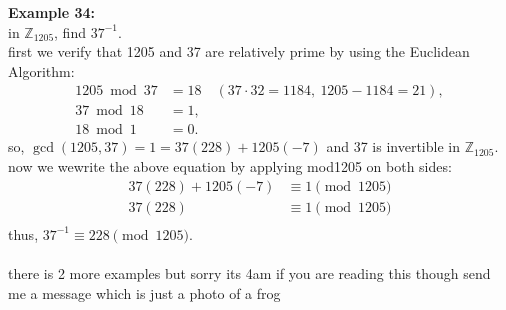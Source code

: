 \documentclass[12pt]{article}
\begin{document}
\vspace{5mm}
\noindent\textbf{Example 34:}
\\ in $\mathbb{Z}_{1205}$, find $37^{-1}$.
\\first we verify that 1205 and 37 are relatively prime by using the Euclidean Algorithm:
\begin{align*}
1205 \bmod 37 &= 18 \quad(37\cdot 32 = 1184,\ 1205-1184=21), \\   
37 \bmod 18 &= 1, \\
18 \bmod 1 &= 0.
\end{align*}
so, $\gcd(1205,37) = 1 = 37(228) +1205(-7)$ and 37 is invertible in $\mathbb{Z}_{1205}$.
\\now we wewrite the above equation by applying mod1205 on both sides:
\begin{align*}
37(228) +1205(-7) &\equiv 1 \pmod{1205} \\
37(228) &\equiv 1 \pmod{1205} \\
\end{align*}
thus, $37^{-1} \equiv 228 \pmod{1205}$.
\\\\
there is 2 more examples but sorry its 4am if you are reading this though send me a message which is just a photo of a frog
\end{document}

